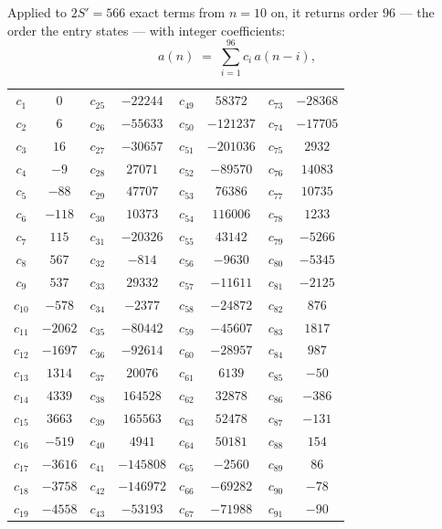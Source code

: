 \documentclass[11pt,a4paper]{article}
\theoremstyle{plain}
\theoremstyle{definition}
\begin{document}
Applied to $2S'=566$ exact terms from $n=10$ on, it returns order $96$ --- the
order the entry states --- with integer coefficients:
\[
a(n)\;=\;\sum_{i=1}^{96}c_i\,a(n-i),
\]
\begin{center}\small
\begin{tabular}{cccccccc}
$c_{1}$ & $0$ & $c_{25}$ & $-22244$ & $c_{49}$ & $58372$ & $c_{73}$ & $-28368$ \\
$c_{2}$ & $6$ & $c_{26}$ & $-55633$ & $c_{50}$ & $-121237$ & $c_{74}$ & $-17705$ \\
$c_{3}$ & $16$ & $c_{27}$ & $-30657$ & $c_{51}$ & $-201036$ & $c_{75}$ & $2932$ \\
$c_{4}$ & $-9$ & $c_{28}$ & $27071$ & $c_{52}$ & $-89570$ & $c_{76}$ & $14083$ \\
$c_{5}$ & $-88$ & $c_{29}$ & $47707$ & $c_{53}$ & $76386$ & $c_{77}$ & $10735$ \\
$c_{6}$ & $-118$ & $c_{30}$ & $10373$ & $c_{54}$ & $116006$ & $c_{78}$ & $1233$ \\
$c_{7}$ & $115$ & $c_{31}$ & $-20326$ & $c_{55}$ & $43142$ & $c_{79}$ & $-5266$ \\
$c_{8}$ & $567$ & $c_{32}$ & $-814$ & $c_{56}$ & $-9630$ & $c_{80}$ & $-5345$ \\
$c_{9}$ & $537$ & $c_{33}$ & $29332$ & $c_{57}$ & $-11611$ & $c_{81}$ & $-2125$ \\
$c_{10}$ & $-578$ & $c_{34}$ & $-2377$ & $c_{58}$ & $-24872$ & $c_{82}$ & $876$ \\
$c_{11}$ & $-2062$ & $c_{35}$ & $-80442$ & $c_{59}$ & $-45607$ & $c_{83}$ & $1817$ \\
$c_{12}$ & $-1697$ & $c_{36}$ & $-92614$ & $c_{60}$ & $-28957$ & $c_{84}$ & $987$ \\
$c_{13}$ & $1314$ & $c_{37}$ & $20076$ & $c_{61}$ & $6139$ & $c_{85}$ & $-50$ \\
$c_{14}$ & $4339$ & $c_{38}$ & $164528$ & $c_{62}$ & $32878$ & $c_{86}$ & $-386$ \\
$c_{15}$ & $3663$ & $c_{39}$ & $165563$ & $c_{63}$ & $52478$ & $c_{87}$ & $-131$ \\
$c_{16}$ & $-519$ & $c_{40}$ & $4941$ & $c_{64}$ & $50181$ & $c_{88}$ & $154$ \\
$c_{17}$ & $-3616$ & $c_{41}$ & $-145808$ & $c_{65}$ & $-2560$ & $c_{89}$ & $86$ \\
$c_{18}$ & $-3758$ & $c_{42}$ & $-146972$ & $c_{66}$ & $-69282$ & $c_{90}$ & $-78$ \\
$c_{19}$ & $-4558$ & $c_{43}$ & $-53193$ & $c_{67}$ & $-71988$ & $c_{91}$ & $-90$ \\

\end{tabular}
\end{center}
\end{document}

